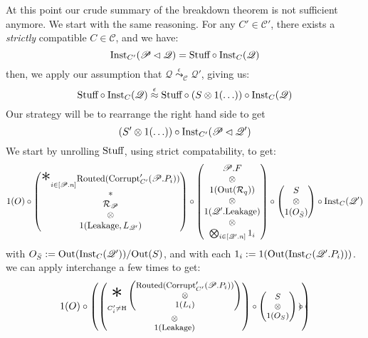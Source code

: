 \begin{theorem}
   At this point our crude summary of the breakdown theorem is not
  sufficient anymore.
  We start with the same reasoning.
  For any $C' \in \mathscr{C}'$, there exists a \emph{strictly}
  compatible $C \in \mathscr{C}$, and we have:
  $$
  \tx{Inst}_{C'}(\mathscr{P} \lhd \mathscr{Q}) = \tx{Stuff} \circ \tx{Inst}_C(\mathscr{Q})
  $$
  then, we apply our assumption that $\mathscr{Q} \overset{\epsilon}{\leadsto}_{\mathscr{C}} \mathscr{Q}'$,
  giving us:
  $$
  \tx{Stuff} \circ \tx{Inst}_C(\mathscr{Q}) \overset{\epsilon}{\approx} \tx{Stuff} \circ (S \otimes 1(\ldots)) \circ \tx{Inst}_C(\mathscr{Q})
  $$
  Our strategy will be to rearrange the right hand side to get
  $$
  {(S' \otimes 1(\ldots)) \circ \tx{Inst}_{C'}(\mathscr{P} \lhd \mathscr{Q}')}
  $$
  We start by unrolling $\tx{Stuff}$, using strict compatability, to get:
  $$
  1(O)\circ
  \begin{pmatrix}
    {\displaystyle \bigast}_{i \in [\mathscr{P}.n]} \tx{Routed}(\tx{Corrupt}'_{C'}(\mathscr{P}.P_i))
    \cr
    *\cr
    \mathcal{R}_{\mathscr{P}}\cr
    \otimes\cr
    1(\tx{Leakage}, L_{\mathscr{Q}'})
  \end{pmatrix}
  \circ
  \begin{pmatrix}
    \mathscr{P}.F\cr
    \otimes\cr
    1(\tx{Out}(\mathcal{R}_q))\cr
    \otimes\cr
    1(\mathscr{Q}'.\tx{Leakage})\cr
    \otimes\cr
    \bigotimes_{i \in [\mathscr{Q}'.n]} 1_i\cr
  \end{pmatrix}
  \circ
  \begin{pmatrix}
    S\cr
    \otimes\cr
    1(O_{\bar{S}})
  \end{pmatrix}
  \circ
  \tx{Inst}_C(\mathscr{Q}')
  $$
  with $O_{\bar{S}} := \tx{Out}(\tx{Inst}_C(\mathscr{Q}')) / \tx{Out}(S)$,
  and with each $1_i := 1(\tx{Out}(\tx{Inst}_C(\mathscr{Q}'.P_i)))$.
  we can apply interchange a few times to get:
  $$
  \footnotesize
  1(O) \circ
  \begin{pmatrix}
    \begin{pmatrix}
    {\displaystyle \bigast_{C'_i \neq \tx{H}}}
    \begin{pmatrix}
      \tx{Routed}(\tx{Corrupt}'_{C'}(\mathscr{P}.P_i))\cr
      \otimes\cr
      1(L_i)
    \end{pmatrix}\cr
    \otimes\cr
    1(\tx{Leakage})
    \end{pmatrix}
    \circ
    \begin{pmatrix}
      S\cr
      \otimes\cr
      1(O_S)
    \end{pmatrix}
    \circ
    \begin{pmatrix}

\end{pmatrix}
\end{pmatrix}$$
\end{theorem}
